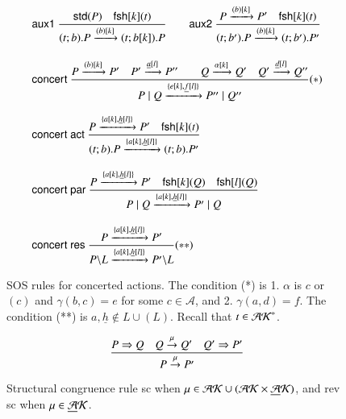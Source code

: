 \begin{figure}[t] 
\[
\begin{array}{l}
\rulename{aux1}\ 
\Rule{\std{P} \quad \fresh{k}{t}}
{(t;b).P \xrightarrow{(b)[k]}(t;b[k]).P}
\qquad
\rulename{aux2}\
\Rule
{P \xrightarrow{(b)[k]} P' \quad \fresh{k}{t}}
{(t;b').P \xrightarrow{(b)[k]} (t;b').P'}
\\[25pt]
\rulename{concert}\ 
\Rule
{P\xrightarrow{(b)[k]}P' \quad P'\xrightarrow{\underline{a}[l]}P'' \qquad Q\xrightarrow{\alpha[k]}Q' 
  \quad Q'\xrightarrow{\underline{d}[l]}Q''%
 }
{P \paral Q\xrightarrow{\{e[k],\underline{f}[l]\}} P'' \paral Q''} (*)\\[25pt]
\rulename{concert act}\
\Rule
{P \xrightarrow{\{{a}[k], \underline{h}[l]\}} P' \quad \fresh{k}{t}}
{(t;b).P \xrightarrow{\{{a}[k], \underline{h}[l]\}} (t;b).P'}\\[25pt]
\rulename{concert par}\
\Rule
{P \xrightarrow{\{{a}[k], \underline{h}[l]\}} P'\quad \fresh{k}{Q} \quad \fresh{l}{Q}}
{P \paral Q \xrightarrow{\{{a}[k], \underline{h}[l]\}} P' \paral Q}\\[25pt]
\rulename{concert res}\
\Rule
{P \xrightarrow{\{{a}[k], \underline{h}[l]\}} P'}
{P\backslash L \xrightarrow{\{{a}[k], \underline{h}[l]\}} P'\backslash L} (**)
%
\end{array}
\] 
\caption{SOS rules for concerted actions. The condition (*) is 1. $\alpha$ is $c$ or $(c)$ 
and $\gamma(b,c)=e$ for some $c\in \mathcal{A}$, and 2. $\gamma(a,d)=f$. 
The condition (**) is $a, \underline{h}  \notin L \cup (L)$. 
Recall that $t \in \mathcal{AK}^*$.} \label{fig:csos}
\end{figure}

\begin{figure}[t] 
\[
\begin{array}{l}
\displaystyle{\frac{P \Rightarrow Q \quad Q \stackrel{\mu}{\rightarrow} Q' \quad Q' \Rightarrow P'}{P\stackrel{\mu}{\rightarrow} P'}} 
\end{array}
\] 
\caption{Structural congruence rule sc when $\mu\in \mathcal{AK} \cup (\mathcal{AK}\times \underline{\mathcal{A}}\mathcal{K})$,
and rev sc when $\mu\in \underline{\mathcal{A}}\mathcal{K}$.} 
\label{fig:sc}
\end{figure}

